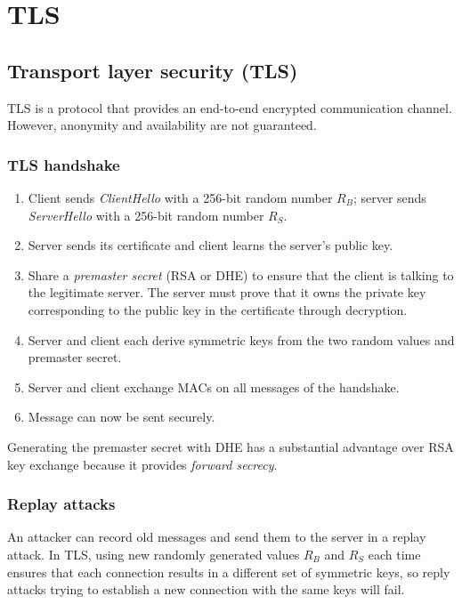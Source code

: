 \chapter{TLS}

\section{Transport layer security (TLS)}
TLS is a protocol that provides an end-to-end encrypted communication channel. However, anonymity and availability are not guaranteed.

\subsection{TLS handshake}
\begin{enumerate}
    \item Client sends \emph{ClientHello} with a 256-bit random number $R_B$; server sends \emph{ServerHello} with a 256-bit random number $R_S$.
    \item Server sends its certificate and client learns the server's public key.
    \item Share a \emph{premaster secret} (RSA or DHE) to ensure that the client is talking to the legitimate server. The server must prove that it owns the private key corresponding to the public key in the certificate through decryption.
    \item Server and client each derive symmetric keys from the two random values and premaster secret.
    \item Server and client exchange MACs on all messages of the handshake.
    \item Message can now be sent securely.
\end{enumerate}

Generating the premaster secret with DHE has a substantial advantage over RSA key exchange because it provides \emph{forward secrecy}.

\subsection{Replay attacks}
An attacker can record old messages and send them to the server in a replay attack. In TLS, using new randomly generated values $R_B$ and $R_S$ each time ensures that each connection results in a different set of symmetric keys, so reply attacks trying to establish a new connection with the same keys will fail.
